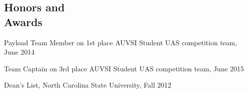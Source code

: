 \documentclass[margin,line]{resume}
\begin{document}
\begin{resume}
    \section{\mysidestyle Honors and\\Awards}

    Payload Team Member on 1st place AUVSI Student UAS competition team, June 2014\\
	\vspace{-8mm}

	Team Captain on 3rd place AUVSI Student UAS competition team, June 2015\\
	\vspace{-8mm}

    Dean's List, North Carolina State University, Fall 2012


\end{resume}
\end{document}
